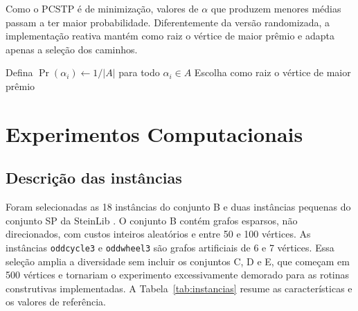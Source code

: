 \documentclass[12pt]{article}
\begin{document}
Como o PCSTP é de minimização, valores de $\alpha$ que produzem menores médias passam a ter maior probabilidade. Diferentemente da versão randomizada, a implementação reativa mantém como raiz o vértice de maior prêmio e adapta apenas a seleção dos caminhos.

\begin{algorithm}[htbp]
\caption{Guloso randomizado reativo}
\label{alg:reativo}
Defina $\Pr(\alpha_i)\leftarrow1/|A|$ para todo $\alpha_i\in A$\;
Escolha como raiz o vértice de maior prêmio\;
\;
\end{algorithm}

\section{Experimentos Computacionais}
\label{sec:experimentos}

\subsection{Descrição das instâncias}

Foram selecionadas as 18 instâncias do conjunto B e duas instâncias pequenas do conjunto SP da SteinLib \cite{koch2001steinlib}. O conjunto B contém grafos esparsos, não direcionados, com custos inteiros aleatórios e entre 50 e 100 vértices. As instâncias \texttt{oddcycle3} e \texttt{oddwheel3} são grafos artificiais de 6 e 7 vértices. Essa seleção amplia a diversidade sem incluir os conjuntos C, D e E, que começam em 500 vértices e tornariam o experimento excessivamente demorado para as rotinas construtivas implementadas. A Tabela~\ref{tab:instancias} resume as características e os valores de referência.
\end{document}
